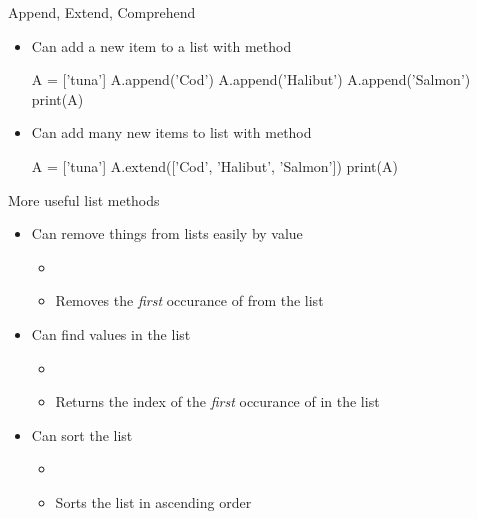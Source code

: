 \documentclass[pdf, aspectratio=169, 12pt]{beamer}
\begin{document}


\begin{frame}[fragile]{Append, Extend, Comprehend}
	\begin{itemize}
		\item Can add a new item to a list with  method
			\begin{pythoncode}
				A = ['tuna']
				A.append('Cod')
				A.append('Halibut')
				A.append('Salmon')
				print(A)
			\end{pythoncode}
		\item Can add many new items to list with  method
			\begin{pythoncode}
				A = ['tuna']
				A.extend(['Cod', 'Halibut', 'Salmon'])
				print(A)
			\end{pythoncode}
	\end{itemize}
\end{frame}

\begin{frame}{More useful list methods}
	\begin{itemize}
		\item Can remove things from lists easily by value
			\begin{itemize}
				\item {}
				\item Removes the \emph{first} occurance of  from the list 
			\end{itemize}
		\item Can find values in the list
			\begin{itemize}
				\item {}
				\item Returns the index of the \emph{first} occurance of  in the list 
			\end{itemize}
		\item Can sort the list
			\begin{itemize}
				\item {}
				\item Sorts the list in ascending order
			\end{itemize}
			
	\end{itemize}
	
\end{frame}
\end{document}
